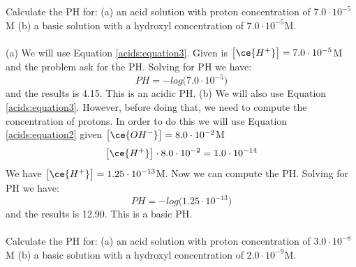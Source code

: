 \documentclass[main.tex]{subfiles}
\newcommand\chapterlabel{acids}
\begin{document}
\begin{description}
\begin{example} %
Calculate the PH for: (a) an acid solution with proton concentration of $7.0\cdot 10^{-5}$M (b) a basic solution with a hydroxyl concentration of $7.0\cdot 10^{-5}$M.
\\
\\
(a) We will use Equation \ref{\chapterlabel:equation3}. Given is $\big[ \ce{H^+}\big]=7.0\cdot 10^{-5}$M and the problem ask for the PH. Solving for PH we have:
\begin{equation*}
PH=-log \big(7.0\cdot 10^{-5}\big) 
 \end{equation*}
and the results is 4.15. This is an acidic PH.
(b) We will also use Equation \ref{\chapterlabel:equation3}. However, before doing that, we need to compute the concentration of protons. In order to do this we will use Equation \ref{\chapterlabel:equation2} given $\big[ \ce{OH^-} \big]=8.0\cdot 10^{-2}$M
 \begin{equation*}\big[ \ce{H^+} \big] \cdot 8.0\cdot 10^{-2}=1.0\cdot 10^{-14}\end{equation*}
We have $\big[ \ce{H^+} \big]=1.25\cdot 10^{-13}$M. Now we can compute the PH. Solving for PH we have:
\begin{equation*}
PH=-log \big(1.25\cdot 10^{-13}\big) 
 \end{equation*}
and the results is 12.90. This is a basic PH.
\\
\faDiamond\ \\
Calculate the PH for: (a) an acid solution with proton concentration of $3.0\cdot 10^{-8}$M (b) a basic solution with a hydroxyl concentration of $2.0\cdot 10^{-9}$M.\\
\end{example}%











\end{description}
\end{document}
